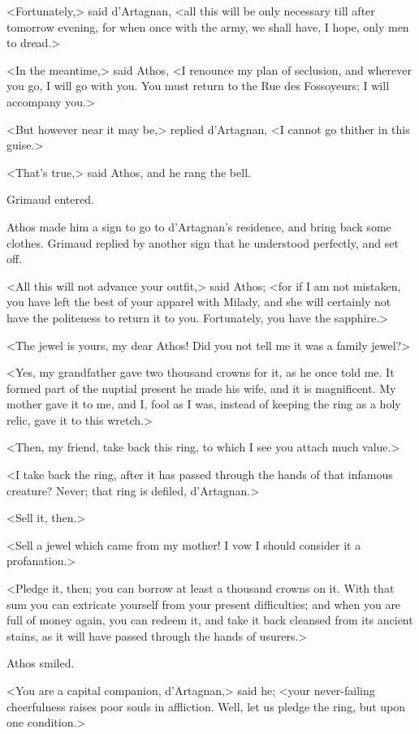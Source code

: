 <Fortunately,> said d'Artagnan, <all this will be only necessary till after tomorrow evening, for when once with the army, we shall have, I hope, only men to dread.> 

<In the meantime,> said Athos, <I renounce my plan of seclusion, and wherever you go, I will go with you. You must return to the Rue des Fossoyeurs; I will accompany you.> 

<But however near it may be,> replied d'Artagnan, <I cannot go thither in this guise.> 

<That's true,> said Athos, and he rang the bell. 

Grimaud entered. 

Athos made him a sign to go to d'Artagnan's residence, and bring back some clothes. Grimaud replied by another sign that he understood perfectly, and set off. 

<All this will not advance your outfit,> said Athos; <for if I am not mistaken, you have left the best of your apparel with Milady, and she will certainly not have the politeness to return it to you. Fortunately, you have the sapphire.> 

<The jewel is yours, my dear Athos! Did you not tell me it was a family jewel?> 

<Yes, my grandfather gave two thousand crowns for it, as he once told me. It formed part of the nuptial present he made his wife, and it is magnificent. My mother gave it to me, and I, fool as I was, instead of keeping the ring as a holy relic, gave it to this wretch.> 

<Then, my friend, take back this ring, to which I see you attach much value.> 

<I take back the ring, after it has passed through the hands of that infamous creature? Never; that ring is defiled, d'Artagnan.> 

<Sell it, then.> 

<Sell a jewel which came from my mother! I vow I should consider it a profanation.> 

<Pledge it, then; you can borrow at least a thousand crowns on it. With that sum you can extricate yourself from your present difficulties; and when you are full of money again, you can redeem it, and take it back cleansed from its ancient stains, as it will have passed through the hands of usurers.> 

Athos smiled. 

<You are a capital companion, d'Artagnan,> said he; <your never-failing cheerfulness raises poor souls in affliction. Well, let us pledge the ring, but upon one condition.> 

